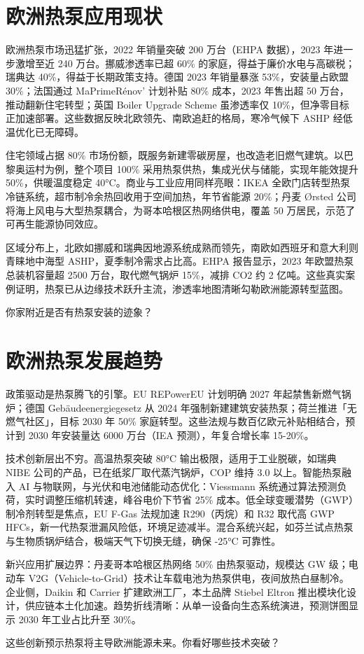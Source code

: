 \chapter{欧洲热泵应用现状}
欧洲热泵市场迅猛扩张，2022 年销量突破 200 万台（EHPA 数据），2023 年进一步激增至近 240 万台。挪威渗透率已超 60\%{} 的家庭，得益于廉价水电与高碳税；瑞典达 40\%{}，得益于长期政策支持。德国 2023 年销量暴涨 53\%{}，安装量占欧盟 30\%{}；法国通过 MaPrimeRénov' 计划补贴 80\%{} 成本，2023 年售出超 50 万台，推动翻新住宅转型；英国 Boiler Upgrade Scheme 虽渗透率仅 10\%{}，但净零目标正加速部署。这些数据反映北欧领先、南欧追赶的格局，寒冷气候下 ASHP 经低温优化已无障碍。\par
住宅领域占据 80\%{} 市场份额，既服务新建零碳房屋，也改造老旧燃气建筑。以巴黎奥运村为例，整个项目 100\%{} 采用热泵供热，集成光伏与储能，实现年能效提升 50\%{}，供暖温度稳定 40°C。商业与工业应用同样亮眼：IKEA 全欧门店转型热泵冷链系统，超市制冷余热回收用于空间加热，年节省能源 20\%{}；丹麦 Ørsted 公司将海上风电与大型热泵耦合，为哥本哈根区热网络供电，覆盖 50 万居民，示范了可再生能源协同效应。\par
区域分布上，北欧如挪威和瑞典因地源系统成熟而领先，南欧如西班牙和意大利则青睐地中海型 ASHP，夏季制冷需求占比高。EHPA 报告显示，2023 年欧盟热泵总装机容量超 2500 万台，取代燃气锅炉 15\%{}，减排 CO2 约 2 亿吨。这些真实案例证明，热泵已从边缘技术跃升主流，渗透率地图清晰勾勒欧洲能源转型蓝图。\par
你家附近是否有热泵安装的迹象？\par
\chapter{欧洲热泵发展趋势}
政策驱动是热泵腾飞的引擎。EU REPowerEU 计划明确 2027 年起禁售新燃气锅炉；德国 Gebäudeenergiegesetz 从 2024 年强制新建建筑安装热泵；荷兰推进「无燃气社区」，目标 2030 年 50\%{} 家庭转型。这些法规与数百亿欧元补贴相结合，预计到 2030 年安装量达 6000 万台（IEA 预测），年复合增长率 15-20\%{}。\par
技术创新层出不穷。高温热泵突破 80°C 输出极限，适用于工业脱碳，如瑞典 NIBE 公司的产品，已在纸浆厂取代蒸汽锅炉，COP 维持 3.0 以上。智能热泵融入 AI 与物联网，与光伏和电池储能动态优化：Viessmann 系统通过算法预测负荷，实时调整压缩机转速，峰谷电价下节省 25\%{} 成本。低全球变暖潜势（GWP）制冷剂转型是焦点，EU F-Gas 法规加速 R290（丙烷）和 R32 取代高 GWP HFCs，新一代热泵泄漏风险低，环境足迹减半。混合系统兴起，如芬兰试点热泵与生物质锅炉结合，极端天气下切换无缝，确保 -25°C 可靠性。\par
新兴应用扩展边界：丹麦哥本哈根区热网络 50\%{} 由热泵驱动，规模达 GW 级；电动车 V2G（Vehicle-to-Grid）技术让车载电池为热泵供电，夜间放热白昼制冷。企业侧，Daikin 和 Carrier 扩建欧洲工厂，本土品牌 Stiebel Eltron 推出模块化设计，供应链本土化加速。趋势折线清晰：从单一设备向生态系统演进，预测饼图显示 2030 年工业占比升至 30\%{}。\par
这些创新预示热泵将主导欧洲能源未来。你看好哪些技术突破？\par
